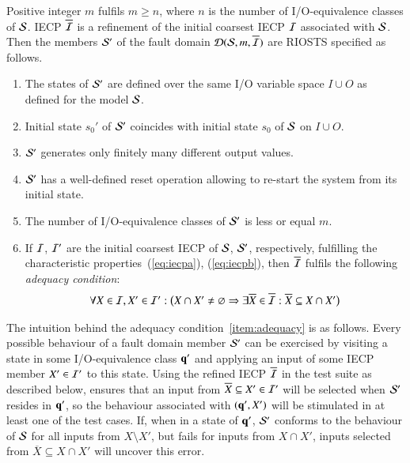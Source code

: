 Positive integer $m$ fulfils   
$m\ge n$, where $n$ is the number of I/O-equivalence classes of ${\cal S}$.
IECP $\overline{{\cal I}}$ is a refinement of the initial coarsest IECP ${\cal I}$  associated with ${\cal S}$.
Then the
  members ${\cal S}'$ of the fault domain ${\cal D}({\cal S},m,\overline{{\cal I}})$ 
are RIOSTS specified as follows.
\begin{enumerate}
\item The states of ${\cal S}'$ are defined over the same I/O variable space $ I \cup O$ as defined for the model ${\cal S}$.

\item Initial state $s_0'$ of ${\cal S}'$ coincides with initial state 
$s_0$ of ${\cal S}$ on $I\cup O$. 

\item ${\cal S}'$ generates only finitely many different output values. 

\item ${\cal S}'$ has a well-defined reset operation allowing to re-start the system from its initial state.

\item The number of I/O-equivalence classes of ${\cal S}'$ is less or equal $m$.
 


\item
\label{item:adequacy}  If ${\cal I}$, ${\cal I}'$ are the initial coarsest IECP of  ${\cal S}$, ${\cal S}'$, respectively, 
fulfilling the characteristic properties~(\ref{eq:iecpa}), (\ref{eq:iecpb}), then 
$\overline{{\cal I}}$ fulfils
  the following \emph{adequacy condition}: 
\begin{equation}\label{eq:x2}
\begin{array}{l}
\forall X\in {\cal I}, X'\in {\cal I}':  
\big(X\cap X'\neq\varnothing \Rightarrow
\exists \overline{X}\in \overline{{\cal I}}: \overline{X} \subseteq X\cap X'\big)
\end{array}
\end{equation}


\end{enumerate}



The intuition behind the adequacy condition~\ref{item:adequacy} is as follows. Every possible behaviour of a fault domain member ${\cal S}'$ can be exercised by visiting a state in 
some I/O-equivalence class $\textbf{q}'$ and applying an input of some IECP member $X'\in {\cal I}'$
to this state. Using the refined IECP $\overline{{\cal I}}$ in the test suite as described below,
ensures that an input from $\overline{X}\subseteq X'\in {\cal I}'$ will be selected when 
${\cal S}'$ resides in $\textbf{q}'$, so the behaviour associated with $(\textbf{q}',X')$ will be stimulated in
at least one of the test cases. If,  when in a 
state of $\textbf{q}'$,  ${\cal S}'$
conforms to the behaviour of ${\cal S}$ for all inputs from $X \setminus X'$, but fails
for inputs from $X\cap X'$, inputs selected from $\overline{X}\subseteq X\cap X'$ will uncover this error.

